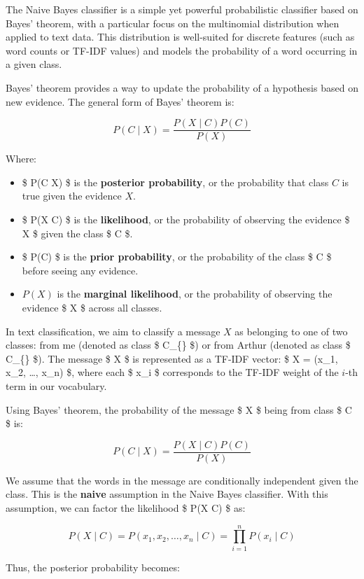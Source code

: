 \documentclass[11pt]{article}
\providecommand{\tightlist}{%
      \setlength{\itemsep}{0pt}\setlength{\parskip}{0pt}}
\begin{document}
The Naive Bayes classifier is a simple yet powerful probabilistic
classifier based on Bayes' theorem, with a particular focus on the
multinomial distribution when applied to text data. This distribution is
well-suited for discrete features (such as word counts or TF-IDF values)
and models the probability of a word occurring in a given class.

Bayes' theorem provides a way to update the probability of a hypothesis
based on new evidence. The general form of Bayes' theorem is:

\[
P(C \mid X) = \frac{P(X \mid C) P(C)}{P(X)}
\]

Where:

\begin{itemize}
\tightlist
\item
  \$ P(C \mid X) \$ is the \textbf{posterior probability}, or the
  probability that class \(C\) is true given the evidence \(X\).
\item
  \$ P(X \mid C) \$ is the \textbf{likelihood}, or the probability of
  observing the evidence \$ X \$ given the class \$ C \$.
\item
  \$ P(C) \$ is the \textbf{prior probability}, or the probability of
  the class \$ C \$ before seeing any evidence.
\item
  \(P(X)\) is the \textbf{marginal likelihood}, or the probability of
  observing the evidence \$ X \$ across all classes.
\end{itemize}

In text classification, we aim to classify a message \(X\) as belonging
to one of two classes: from me (denoted as class \$ C\_\{\} \$)
or from Arthur (denoted as class \$ C\_\{\} \$). The
message \$ X \$ is represented as a TF-IDF vector: \$ X = (x\_1, x\_2,
\dots, x\_n) \$, where each \$ x\_i \$ corresponds to the TF-IDF weight
of the \(i\)-th term in our vocabulary.

Using Bayes' theorem, the probability of the message \$ X \$ being from
class \$ C \$ is:

\[
P(C \mid X) = \frac{P(X \mid C) P(C)}{P(X)}
\]

We assume that the words in the message are conditionally independent
given the class. This is the \textbf{naive} assumption in the Naive
Bayes classifier. With this assumption, we can factor the likelihood \$
P(X \mid C) \$ as:

\[
P(X \mid C) = P(x_1, x_2, \dots, x_n \mid C) = \prod_{i=1}^{n} P(x_i \mid C)
\]

Thus, the posterior probability becomes:
\end{document}

